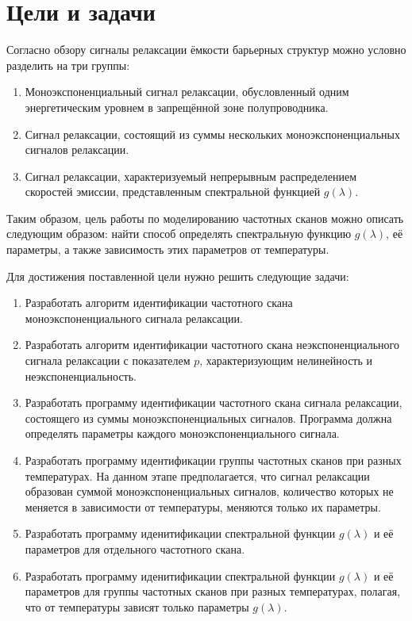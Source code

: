 \chapter{Цели и задачи}

Согласно обзору \cite{istratov_exp_analysis} сигналы релаксации ёмкости 
барьерных структур можно условно разделить на три группы:
\begin{enumerate}
    \item Моноэкспоненциальный сигнал релаксации, обусловленный одним  
    энергетическим уровнем в запрещённой зоне полупроводника.
    \item Сигнал релаксации, состоящий из суммы нескольких моноэкспоненциальных 
    сигналов релаксации.
    \item Сигнал релаксации, характеризуемый непрерывным распределением скоростей 
    эмиссии, представленным спектральной функцией $g(\lambda)$.
\end{enumerate}

Таким образом, цель работы по моделированию частотных сканов можно описать 
следующим образом: найти способ определять спектральную функцию 
$g(\lambda)$, её параметры, а также зависимость этих параметров от температуры.

Для достижения поставленной цели нужно решить следующие задачи:
\begin{enumerate}
    \item Разработать алгоритм идентификации частотного скана 
    моноэкспоненциального сигнала релаксации.
    \item Разработать алгоритм идентификации частотного скана 
    неэкспоненциального сигнала релаксации с показателем $p$, 
    характеризующим нелинейность и неэкспоненциальность.
    \item Разработать программу идентификации частотного 
    скана сигнала релаксации, состоящего из суммы моноэкспоненциальных 
    сигналов. Программа должна определять параметры каждого 
    моноэкспоненциального сигнала.
    \item Разработать программу идентификации группы частотных сканов 
    при разных температурах. На данном этапе предполагается, что сигнал 
    релаксации образован суммой моноэкспоненциальных сигналов, 
    количество которых не меняется в зависимости от температуры, 
    меняются только их параметры.
    \item Разработать программу иденитификации спектральной 
    функции $g(\lambda)$ и её параметров для отдельного 
    частотного скана.
    \item Разработать программу иденитификации спектральной 
    функции $g(\lambda)$ и её параметров для группы частотных сканов при 
    разных температурах, полагая, что от температуры зависят только 
    параметры $g(\lambda)$.
\end{enumerate}